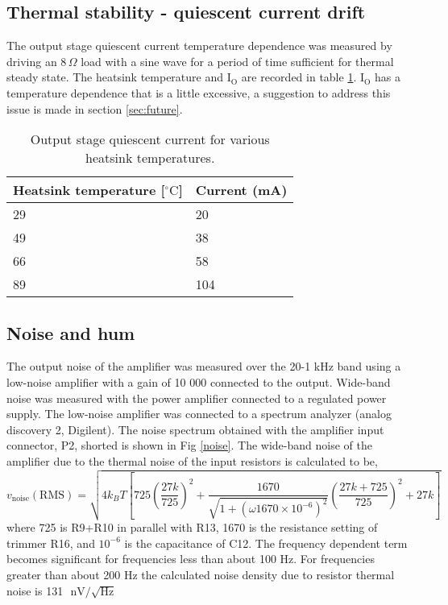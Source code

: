 \documentclass[a4paper,10pt, oneside]{article}
\begin{document}
\subsection*{Thermal stability - quiescent current drift}
The output stage quiescent current temperature dependence was measured by driving an $8\,\Omega$ load with a sine wave for a period of time sufficient for thermal steady state. The heatsink temperature and $\textrm{I}_{\textrm{O}}$ are recorded in table \ref{thermal}. $\textrm{I}_{\textrm{O}}$ has a temperature dependence that is a little excessive, a suggestion to address this issue is made in section \ref{sec:future}.
\begin{table}
\begin{centering}
\begin{tabular}{|l|l|}\hline
Heatsink temperature [$^{\circ}\textrm{C}$] & Current (mA)\\\hline
29 & 20\\\hline
49 & 38\\\hline
66 & 58\\\hline
89 & 104\\\hline
\end{tabular}\caption{Output stage quiescent current for various heatsink temperatures.}\label{thermal}
\end{centering}
\end{table}
\subsection*{Noise and hum}
The output noise of the amplifier was measured over the 20-1 kHz band using a low-noise amplifier with a gain of 10 000 connected to the
output. Wide-band noise was measured with the power amplifier connected to a regulated power supply. 
The low-noise amplifier was connected to a spectrum analyzer (analog discovery 2, Digilent). The noise spectrum obtained with the amplifier 
input connector, P2, shorted is shown in Fig \ref{noise}. The wide-band noise of the amplifier due to the thermal noise of the input resistors is calculated to be,
\begin{equation}
v_{\textrm{noise}}(\textrm{RMS}) = \sqrt{4k_{B}T\left[725
\left(\frac{27k}{725}\right)^{2}+\frac{1670}{\sqrt{1+(\omega 1670\times 10^{-6})^{2}}}\left(\frac{27k+725}{725}\right)^{2}+27k\right]}
\end{equation}
where 725 is R9+R10 in parallel with R13, 1670 is the resistance setting of trimmer R16, and $10^{-6}$ is the capacitance of C12.
The frequency dependent term becomes significant for frequencies less than about 100 Hz. For frequencies greater than about 200 Hz the 
calculated noise density due to resistor thermal noise is 131\,\, $\textrm{nV}/\sqrt{\textrm{Hz}}$
\end{document}
